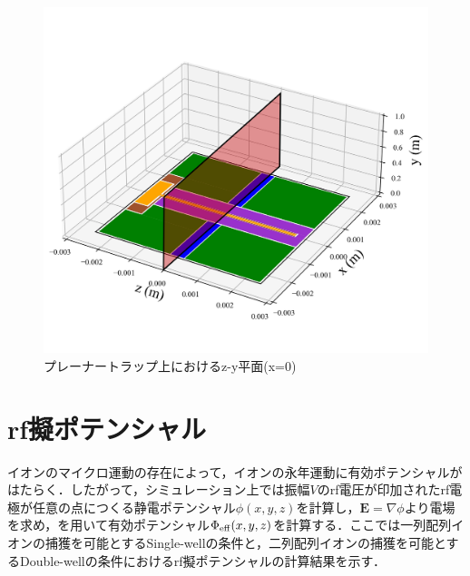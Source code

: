 \normalsize
\begin{figure}[h]
	\begin{center}
		\includegraphics[width = 0.45\linewidth]{./simulation/figure/PlannarTrap_3D_z=0.png}
		\caption{プレーナートラップ上におけるz-y平面(x=0)}
		\label{fig:z-y_x0}
	\end{center}
\end{figure}
%
\clearpage
%

\section{rf擬ポテンシャル}
イオンのマイクロ運動の存在によって，イオンの永年運動に有効ポテンシャルがはたらく．したがって，シミュレーション上では振幅$V$のrf電圧が印加されたrf電極が任意の点につくる静電ポテンシャル$\phi (x,y,z)$を計算し，$\bm{E} = \nabla \phi$より電場を求め，を用いて有効ポテンシャル$\Phi_{\rm eff}(x,y,z)$を計算する．ここでは一列配列イオンの捕獲を可能とするSingle-wellの条件と，二列配列イオンの捕獲を可能とするDouble-wellの条件におけるrf擬ポテンシャルの計算結果を示す．
